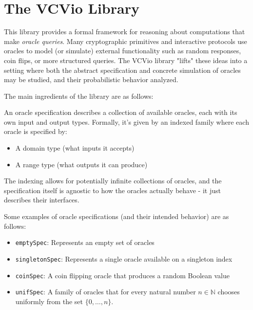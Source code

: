 \section{The VCVio Library}\label{sec:vcvio}

This library provides a formal framework for reasoning about computations that make \emph{oracle
queries}. Many cryptographic primitives and interactive protocols use oracles to model (or simulate)
external functionality such as random responses, coin flips, or more structured queries. The VCVio
library "lifts" these ideas into a setting where both the abstract specification and concrete
simulation of oracles may be studied, and their probabilistic behavior analyzed.

The main ingredients of the library are as follows:

\begin{definition}
    \label{def:oracle_spec}
    An oracle specification describes a collection of available oracles, each with its own input and output types. 
    Formally, it's given by an indexed family where each oracle is specified by:
    \begin{itemize}
        \item A domain type (what inputs it accepts)
        \item A range type (what outputs it can produce)
    \end{itemize}
    The indexing allows for potentially infinite collections of oracles, and the specification itself 
    is agnostic to how the oracles actually behave - it just describes their interfaces.
    \leanok
\end{definition}

Some examples of oracle specifications (and their intended behavior) are as follows:
\begin{itemize}
    \item \verb|emptySpec|: Represents an empty set of oracles
    \item \verb|singletonSpec|: Represents a single oracle available on a singleton index
    \item \verb|coinSpec|: A coin flipping oracle that produces a random Boolean value
    \item \verb|unifSpec|: A family of oracles that for every natural number $n \in \mathbb{N}$ chooses uniformly from the set $\{0, \ldots, n\}$.
\end{itemize}

